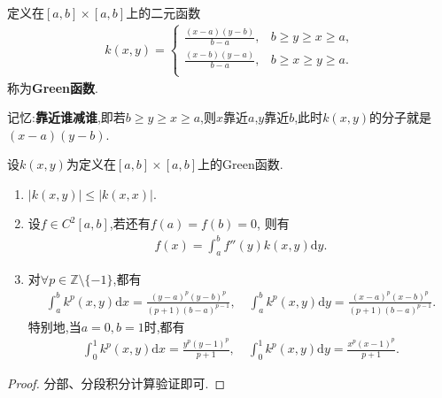 \documentclass[../../main.tex]{subfiles}%
\begin{document}
\begin{definition}[Green函数]\label{definition:Green函数}
定义在$[a,b]\times [a,b]$上的二元函数
\begin{align*}
k(x,y)=\begin{cases}
\frac{\left( x-a \right) \left( y-b \right)}{b-a},&		b\geqslant y\geqslant x\geqslant a,\\
\frac{\left( x-b \right) \left( y-a \right)}{b-a},&		b\geqslant x\geqslant y\geqslant a.\\
\end{cases}
\end{align*}
称为\textbf{Green函数}.
\end{definition}
\begin{remark}
记忆:\textbf{靠近谁减谁},即若$b\geqslant y\geqslant x\geqslant a$,则$x$靠近$a$,$y$靠近$b$,此时$k(x,y)$的分子就是$(x-a)(y-b)$.
\end{remark}

\begin{theorem}[Green函数的性质]\label{theorem:Green函数的性质}
设$k(x,y)$为定义在$[a,b]\times [a,b]$上的Green函数.
\begin{enumerate}[(1)]
\item $|k(x,y)|\leqslant |k(x,x)|.$

\item 设$f\in C^2[a,b]$,若还有$f(a) = f(b) = 0$, 则有
\begin{align*}
f(x) = \int_{a}^{b} f''(y) k(x,y) \mathrm{d}y.
\end{align*}

\item 对$\forall p\in \mathbb{Z}\setminus \{-1\}$,都有
\begin{gather*}
\int_a^b{k^p\left( x,y \right) \mathrm{d}x}=\frac{\left( y-a \right) ^p\left( y-b \right) ^p}{\left( p+1 \right) \left( b-a \right) ^{p-1}},\quad \int_a^b{k^p\left( x,y \right) \mathrm{d}y}=\frac{\left( x-a \right) ^p\left( x-b \right) ^p}{\left( p+1 \right) \left( b-a \right) ^{p-1}}.
\end{gather*}
特别地,当$a=0,b=1$时,都有
\begin{gather*}
\int_0^1{k^p\left( x,y \right) \mathrm{d}x}=\frac{y^p\left( y-1 \right) ^p}{p+1},
\quad 
\int_0^1{k^p\left( x,y \right) \mathrm{d}y}=\frac{x^p\left( x-1 \right) ^p}{p+1}.
\end{gather*}
\end{enumerate}
\end{theorem}
\begin{proof}

分部、分段积分计算验证即可.
\end{proof}
\end{document}
